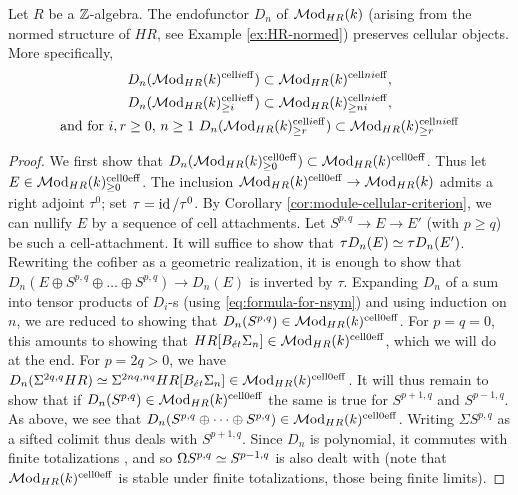 \documentclass{amsart}
\numberwithin{proposition}{section}
\numberwithin{equation}{section}
\def\cell{\mathrm{cell}}
\begin{document}
\begin{lemma} \label{lemm:motives-of-Dn}
Let $R$ be a $\mathbb{Z}$-algebra.
The endofunctor $D_n$ of $\mathcal{M}\mathrm{od}_{HR}(k)$ (arising from the normed structure of $HR$, see Example \ref{ex:HR-normed}) preserves cellular objects.
More specifically, \begin{gather*} D_n(\Mod_{HR}(k)^{\cell i \eff}) \subset \Mod_{HR}(k)^{\cell ni \eff}, \\ D_n(\Mod_{HR}(k)^{\cell i \eff}_{\ge i}) \subset \Mod_{HR}(k)^{\cell ni \eff}_{\ge ni}, \\ \text{and for $i,r \ge 0$, $n \ge 1$ } D_n(\Mod_{HR}(k)^{\cell i \eff}_{\ge r}) \subset \Mod_{HR}(k)^{\cell ni \eff}_{\ge r} \end{gather*}
\end{lemma}
\begin{proof}
We first show that $D_n(\Mod_{HR}(k)^{\cell 0 \eff}_{\ge 0}) \subset \Mod_{HR}(k)^{\cell 0 \eff}$.
Thus let $E \in \Mod_{HR}(k)^{\cell 0 \eff}_{\ge 0}$.
The inclusion $\Mod_{HR}(k)^{\cell 0 \eff} \to \Mod_{HR}(k)$ admits a right adjoint $\tau^0$; set $\tau = \operatorname{id}/\tau^0$.
By Corollary \ref{cor:module-cellular-criterion}, we can nullify $E$ by a sequence of cell attachments.
Let $S^{p,q} \to E \to E'$ (with $p \ge q$) be such a cell-attachment.
It will suffice to show that $\tau D_n(E) \simeq \tau D_n(E')$.
Rewriting the cofiber as a geometric realization, it is enough to show that $D_n(E \oplus S^{p,q} \oplus \dots \oplus S^{p,q}) \to D_n(E)$ is inverted by $\tau$.
Expanding $D_n$ of a sum into tensor products of $D_i$-s (using \eqref{eq:formula-for-nsym}) and using induction on $n$, we are reduced to showing that $D_n(S^{p,q}) \in \Mod_{HR}(k)^{\cell 0 \eff}$.
For $p=q=0$, this amounts to showing that $HR[B_\et\Sigma_n] \in \Mod_{HR}(k)^{\cell 0 \eff}$, which we will do at the end.
For $p = 2q > 0$, we have $D_n(\Sigma^{2q,q} HR) \wequi \Sigma^{2nq,nq}HR[B_\et\Sigma_n] \in \Mod_{HR}(k)^{\cell 0 \eff}$.
It will thus remain to show that if $D_n(S^{p,q}) \in \Mod_{HR}(k)^{\cell 0 \eff}$ the same is true for $S^{p+1,q}$ and $S^{p-1,q}$.
As above, we see that $D_n(S^{p,q} \oplus \dots \oplus S^{p,q}) \in \Mod_{HR}(k)^{\cell 0 \eff}$.
Writing $\Sigma S^{p,q}$ as a sifted colimit thus deals with $S^{p+1,q}$.
Since $D_n$ is polynomial, it commutes with finite totalizations \cite[Proposition 2.15]{k-theory-and-poly-functors}, and so $\Omega S^{p,q} \simeq S^{p-1,q}$ is also dealt with (note that $\Mod_{HR}(k)^{\cell 0 \eff}$ is stable under finite totalizations, those being finite limits).


\end{proof}
\end{document}
